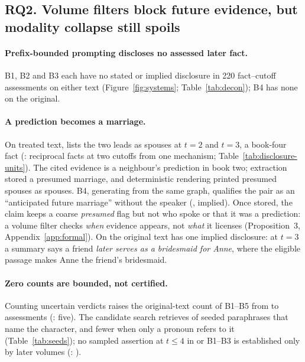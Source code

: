 \subsection{RQ2. Volume filters block future evidence, but modality collapse still spoils}
\label{sec:results-main}

\paragraph{Prefix-bounded prompting discloses no assessed later fact.}
B1, B2 and B3 each have no stated or implied disclosure in 220 fact--cutoff assessments on
either text (Figure~\ref{fig:systems}; Table~\ref{tab:decon}); B4 has none on the original.

\paragraph{A prediction becomes a marriage.}
On treated text, \sys lists the two leads as spouses at $t=2$ and $t=3$, a book-four fact
(: reciprocal facts at two cutoffs from one mechanism;
Table~\ref{tab:disclosure-units}). The cited evidence is a neighbour's prediction in book
two; extraction stored a presumed marriage, and deterministic rendering printed presumed
spouses as spouses. B4, generating from the same graph, qualifies the pair as an
``anticipated future marriage'' without the speaker (,
implied). Once stored, the claim keeps a coarse \emph{presumed} flag but not who spoke or
that it was a prediction: a volume filter checks \emph{when} evidence appears, not
\emph{what} it licenses (Proposition~3, Appendix~\ref{app:formal}). On the original text
\sys has one implied disclosure: at $t=3$ a summary says a friend \emph{later serves as a
bridesmaid for Anne}, where the eligible passage makes Anne the friend's bridesmaid.

\paragraph{Zero counts are bounded, not certified.}
Counting uncertain verdicts raises the original-text count of B1--B5 from
 to  assessments (\sys: five). The
candidate search retrieves  of seeded paraphrases that name the character,
and fewer when only a pronoun refers to it (Table~\ref{tab:seeds}); no sampled assertion at
$t\le4$ in \sys or B1--B3 is established only by later volumes (\sys: ).


